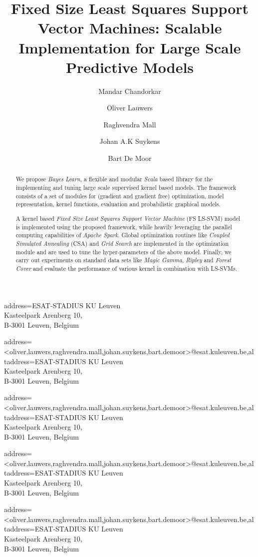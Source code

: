 \documentclass[
    ,final            %
  ]
  {aipproc}
\begin{document}
\title{Fixed Size Least Squares Support Vector Machines: Scalable Implementation for Large Scale Predictive Models}


\author{Mandar Chandorkar}{
  address={ESAT-STADIUS KU Leuven \\ Kasteelpark Arenberg 10, \\ B-3001 Leuven, Belgium}
}

\author{Oliver Lauwers}{
  address={<oliver.lauwers,raghvendra.mall,johan.suykens,bart.demoor>@esat.kuleuven.be},altaddress={ESAT-STADIUS KU Leuven \\ Kasteelpark Arenberg 10, \\ B-3001 Leuven, Belgium}}

\author{Raghvendra Mall}{
  address={<oliver.lauwers,raghvendra.mall,johan.suykens,bart.demoor>@esat.kuleuven.be},altaddress={ESAT-STADIUS KU Leuven \\ Kasteelpark Arenberg 10, \\ B-3001 Leuven, Belgium}}%


\author{Johan A.K Suykens}{
  address={<oliver.lauwers,raghvendra.mall,johan.suykens,bart.demoor>@esat.kuleuven.be},altaddress={ESAT-STADIUS KU Leuven \\ Kasteelpark Arenberg 10, \\ B-3001 Leuven, Belgium} %
}

\author{Bart De Moor}{
  address={<oliver.lauwers,raghvendra.mall,johan.suykens,bart.demoor>@esat.kuleuven.be},altaddress={ESAT-STADIUS KU Leuven \\ Kasteelpark Arenberg 10, \\ B-3001 Leuven, Belgium} %
}



\begin{abstract}
 We propose \textit{Bayes Learn}, a flexible and modular \textit{Scala} based library for the implementing and tuning large scale supervised kernel based models. The framework consists of a set of modules for (gradient and gradient free) optimization, model representation, kernel functions, evaluation and probabilistic graphical models.
 
 A kernel based \emph{Fixed Size Least Squares Support Vector Machine} (FS LS-SVM) model is implemented using the proposed framework, while heavily leveraging the parallel computing capabilities of \textit{Apache Spark}. Global optimization routines like \emph{Coupled Simulated Annealing} (CSA) and \emph{Grid Search} are implemented in the optimization module and are used to tune the hyper-parameters of the above model. Finally, we carry out experiments on standard data sets like \emph{Magic Gamma}, \emph{Ripley} and \emph{Forest Cover} and evaluate the performance of various kernel in combination with LS-SVMs.     
\end{abstract}
\end{document}
